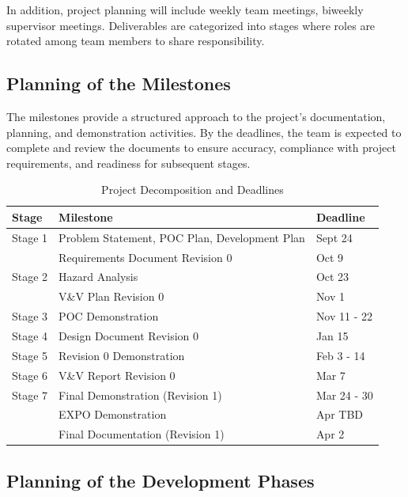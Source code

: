 \documentclass[12pt]{article}
\begin{document}
In addition, project planning will include weekly team meetings, biweekly
supervisor meetings. Deliverables are categorized into stages where roles are
rotated among team members to share responsibility.

\subsection{Planning of the Milestones}

The milestones provide a structured approach to the project's documentation,
planning, and demonstration activities. By the deadlines, the team is expected
to complete and review the documents to ensure accuracy, compliance with project
requirements, and readiness for subsequent stages.

\newpage
\begin{table}[htbp]
  \centering
  \begin{tabular}{|l|l|l|}
  \hline
  \textbf{Stage} & \textbf{Milestone} & \textbf{Deadline} \\
  \hline
  Stage 1 & Problem Statement, POC Plan, Development Plan & Sept 24 \\
  \texttt{} & Requirements Document Revision 0 & Oct 9 \\
  \hline
  Stage 2 & Hazard Analysis & Oct 23 \\
  \texttt{} & V\&V Plan Revision 0 & Nov 1 \\
  \hline
  Stage 3 & POC Demonstration & Nov 11 - 22 \\
  \hline
  Stage 4 & Design Document Revision 0 & Jan 15 \\
  \hline
  Stage 5 & Revision 0 Demonstration & Feb 3 - 14\\
  \hline
  Stage 6 & V\&V Report Revision 0 & Mar 7 \\
  \hline
  Stage 7 & Final Demonstration (Revision 1) & Mar 24 - 30\\
  \texttt{} & EXPO Demonstration & Apr TBD \\
  \texttt{} & Final Documentation (Revision 1) & Apr 2 \\
  \hline
  \end{tabular}
  \caption{Project Decomposition and Deadlines}
  \label{table:2}
\end{table}

\subsection{Planning of the Development Phases}
\end{document}
